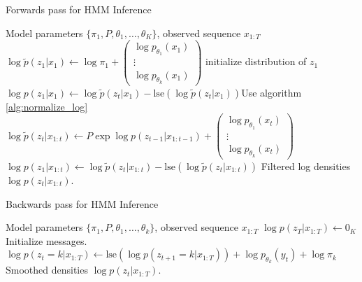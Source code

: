 \documentclass{article}
\begin{document}
\begin{algorithm}
   \caption{Forwards pass for HMM Inference}
   \label{alg:hmm_forwards}
\begin{algorithmic}
   Model parameters $\{\pi_{1}, P, \theta_1, \dots, \theta_K\}$,
  observed sequence $x_{1:T}$
  \STATE $\log \tilde{p}\left(z_{1}\vert x_{1}\right) \leftarrow
  \log\pi_{1} + \begin{pmatrix} \log p_{\theta_{1}}\left(x_{1}\right) \\ \vdots \\ \log p_{\theta_{k}}\left(x_{1}\right) \end{pmatrix}$ \hfill initialize distribution of $z_{1}$
  \STATE $\log p\left(z_{1} \vert x_{1}\right) \leftarrow \log \tilde{p}\left(z_{t} \vert x_{1}\right) - \text{lse}\left(\log \tilde{p}\left(z_{t} \vert x_{1}\right)\right)$\hfill Use algorithm \ref{alg:normalize_log}
  \STATE $\log \tilde{p}\left(z_{t} \vert x_{1:t}\right) \leftarrow P \exp{\log p\left(z_{t - 1} \vert x_{1:t - 1}\right)} + \begin{pmatrix}  \log p_{\theta_{1}}\left(x_{t}\right) \\ \vdots \\ \log p_{\theta_{k}}\left(x_{t}\right) \end{pmatrix}$
  \STATE $\log p\left(z_{1} \vert x_{1:t}\right) \leftarrow \log \tilde{p}\left(z_{t} \vert x_{1:t}\right) - \text{lse}\left(\log \tilde{p}\left(z_{t} \vert x_{1:t}\right)\right)$\hfill
  \ENDFOR
   Filtered log densities $\log p\left(z_{t} \vert x_{1:t}\right)$.
\end{algorithmic}
\end{algorithm}

\begin{algorithm}
  \begin{algorithmic}
   \caption{Backwards pass for HMM Inference}
   \label{alg:hmm_backwards}
    Model parameters $\{\pi_{1}, P, \theta_1, \dots, \theta_k\}$, observed sequence $x_{1:T}$
   \STATE $\log p\left(z_{T} \vert x_{1:T}\right) \leftarrow 0_{K}$ \hfill Initialize messages.
   \STATE $\log p\left(z_{t} = k \vert x_{1:T}\right) \leftarrow \text{lse}\left(\log p\left(z_{t + 1} = k \vert x_{1:T}\right)\right) + \log p_{\theta_{k}}\left(y_{t}\right) + \log \pi_{k}$
   \ENDFOR
   \ENDFOR
    Smoothed densities $\log p\left(z_{t} \vert x_{1:T}\right)$.
  \end{algorithmic}
\end{algorithm}
\end{document}
